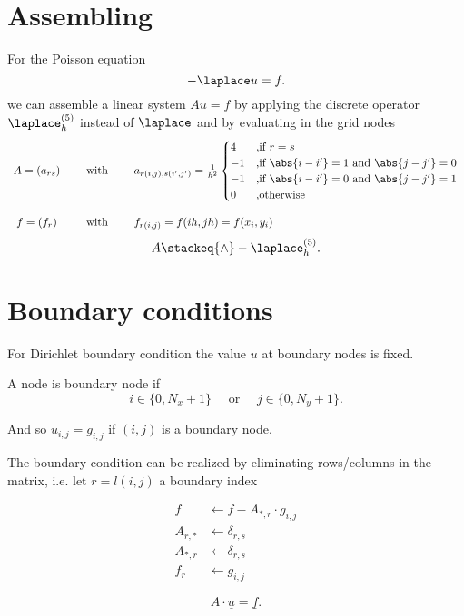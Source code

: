 \section{Assembling}%
\label{sec:Assembling}

For the Poisson equation
\[
-\laplace u = f
.\] 
we can assemble a linear system $Au=f$ by applying the discrete operator $\laplace_{h}^{(5)}$ instead of $\laplace$ and by evaluating in the grid nodes
\[
	\begin{array}{ccl}
	A = (a_{rs}) 
	\quad&\text{ with }\quad 
	&a_{r(i,j),s(i',j')}= \frac{1}{h^{2}}\begin{cases}
		4 &\text{,if } r=s \\
		-1 &\text{,if } \abs{i-i'} = 1 \text{ and } \abs{j-j'} = 0 \\
		-1 &\text{,if } \abs{i-i'} = 0 \text{ and } \abs{j-j'} = 1 \\
		0 &\text{,otherwise}
	\end{cases} \\ \\
	f = (f_{r}) 
	\quad&\text{ with }\quad
	&f_{r(i,j)}=f(ih, jh)=f(x_{i}, y_{i})
	\end{array}
\] 
\[
	 A \stackeq{\wedge} -\laplace_{h}^{(5)}
.\] 

\section{Boundary conditions}%
\label{sec:Boundary condition}
For Dirichlet boundary condition the value $u$ at boundary nodes is fixed.

A node is boundary node if
\[
i \in  \{0, N_{x}+1\} \quad\text{ or }\quad j \in  \{0,N_{y}+1\}
.\] 

And so $u_{i,j} = g_{i,j}$ if $(i,j)$ is a boundary node.

The boundary condition can be realized by eliminating rows/columns in the matrix, i.e. let $r=l(i,j)$ a boundary index

\begin{align*}
	f &\leftarrow f-A_{\ast,r}\cdot g_{i,j} \\
	A_{r,\ast} &\leftarrow \delta_{r,s} \\
	A_{*,r} &\leftarrow \delta_{r,s} \\
	f_{r} &\leftarrow g_{i,j}
\end{align*}

\[
A\cdot \underline{u} = \underline{f}  
.\] 

